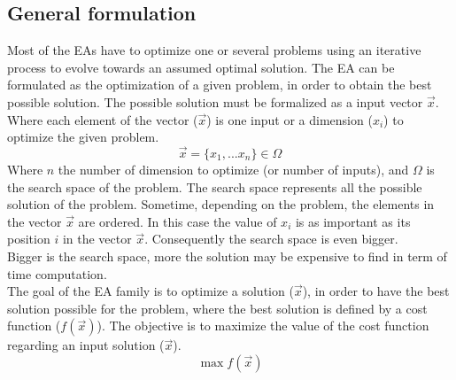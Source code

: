 \subsection{General formulation}\label{sec:GeneralEAform}

 Most of the EAs have to optimize one or several problems using an iterative process to evolve towards an assumed optimal solution. The EA can be formulated as the optimization of a given problem, in order to obtain the best possible solution. %
 The possible solution  must be formalized as a input vector $\vec{x}$.
  Where each element of the vector ($\vec{x}$) is one  input or a dimension ($x_i$) to optimize the given problem. \begin{equation}
	\vec{x}= \{x_1,...x_n \} \in \Omega
\end{equation}
Where $n$ the number of dimension to optimize (or number of inputs), and $\Omega$ is the search space of the problem. The search space represents all the possible solution of the problem.
Sometime, depending on the problem, the elements in the vector $\vec{x}$ are ordered. In this case the value of $x_i$ is as important as its position $i$ in the vector $\vec{x}$. Consequently the search space is even bigger.%
\\ Bigger is the search space, more the solution may be expensive to find in term of time computation.\\
 The goal of the EA family is to optimize a solution ($\vec{x}$), in order to have the best solution possible for the problem, where the best solution is defined by a cost function ($f(\vec{x})$). The objective is to maximize the value of the cost function regarding an input solution ($\vec{x}$). 
 \begin{equation}
	\max f(\vec{x})
\end{equation}
 
